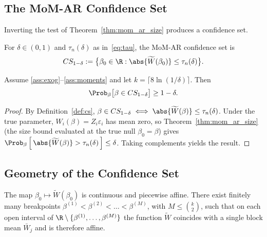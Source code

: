 \subsection{The MoM-AR Confidence Set}
\label{sec:mom_ar_cs}

Inverting the test of Theorem~\ref{thm:mom_ar_size} produces a confidence set.

\begin{definition}
\label{def:cs}
For $\delta\in(0,1)$ and $\tau_n(\delta)$ as in~\eqref{eq:tau}, the MoM-AR
confidence set is
\begin{equation}
  CS_{1-\delta}
    := \bigl\{\beta_0\in\R : \abs{\widetilde{W}(\beta_0)}\le\tau_n(\delta)\bigr\}.
  \label{eq:cs}
\end{equation}
\end{definition}


\begin{theorem}[Coverage]
\label{thm:coverage}
Assume \ref{ass:exog}--\ref{ass:moments} and let
$k=\lceil 8\ln(1/\delta)\rceil$. Then
\[
  \Prob_{\beta}\bigl[\beta\in CS_{1-\delta}\bigr] \ge 1-\delta.
\]
\end{theorem}

\begin{proof}
By Definition~\ref{def:cs}, $\beta\in CS_{1-\delta} \iff \abs{\widetilde{W}(\beta)}\le\tau_n(\delta)$. Under the true parameter, $W_i(\beta)=Z_i\varepsilon_i$ has mean zero, so Theorem~\ref{thm:mom_ar_size} (the size bound evaluated at the true null $\beta_0=\beta$) gives $\Prob_\beta\left[\,\abs{\widetilde{W}(\beta)}>\tau_n(\delta)\,\right]\le\delta$. Taking complements yields the result.
\end{proof}

\subsection{Geometry of the Confidence Set}
\label{sec:geometry}

\begin{theorem}
\label{thm:piecewise}
The map $\beta_0\mapsto\widetilde{W}(\beta_0)$ is continuous and piecewise affine. There exist finitely many breakpoints $\beta^{(1)}<\beta^{(2)}<\dots<\beta^{(M)}$, with $M\le\binom{k}{2}$, such that on each open interval of $\R\setminus\{\beta^{(1)},\dots,\beta^{(M)}\}$ the function $\widetilde{W}$ coincides with a single block mean $\bar{W}_j$ and is therefore affine.
\end{theorem}

